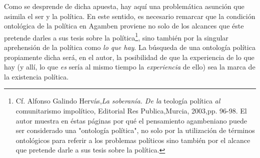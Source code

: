 \documentclass{book}
\begin{document}
Como se desprende de dicha apuesta, hay aquí una problemática asunción
que asimila el ser y la política. En este sentido, es necesario remarcar
que la condición ontológica de la política en Agamben proviene no solo
de los alcances que éste pretende darles a sus tesis sobre la
política\footnote{Cf. Alfonso Galindo Hervás,\emph{La soberanía. De la}
  teología política \emph{al} comunitarismo impolítico, Editorial Res
  Publica,Murcia, 2003,pp. 96-98. El autor muestra en éstas páginas por
  qué el pensamiento agambeniano puede ser considerado una "ontología
  política", no solo por la utilización de términos ontológicos para
  referir a los problemas políticos sino también por el alcance que
  pretende darle a sus tesis sobre la política.}, sino también por la
singular aprehensión de la política como \emph{lo que hay}. La búsqueda
de una ontología política propiamente dicha será, en el autor, la
posibilidad de que la experiencia de lo que hay (y allí, lo que
\emph{es} sería al mismo tiempo la \emph{experiencia} de ello) sea la
marca de la existencia política.
\end{document}
